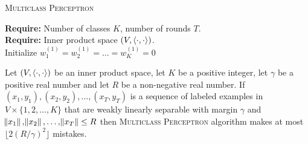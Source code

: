 \begin{algorithm}[h]
\caption{\textsc{Multiclass Perceptron}
\label{algorithm:mutliclass-perceptron}}
\textbf{Require:} Number of classes $K$, number of rounds $T$. \\
\textbf{Require:} Inner product space $(V,\left\langle \cdot, \cdot \right\rangle)$. \\
Initialize $w_1^{(1)} = w_2^{(1)} = \dots = w_K^{(1)} = 0$ \\
\end{algorithm}

\begin{theorem}
\label{theorem:mutliclass-perceptron-mistake-upper-bound}
Let $(V, \left\langle \cdot, \cdot \right\rangle)$ be an inner product space, let $K$ be a positive
integer, let $\gamma$ be a positive real number and let $R$ be a non-negative real
number. If $(x_1, y_1), (x_2, y_2), \dots, (x_T, y_T)$ is a sequence of labeled
examples in $V \times \{1,2,\dots,K\}$ that are weakly linearly separable with margin
$\gamma$ and $\norm{x_1}, \norm{x_2}, \dots, \norm{x_T} \le R$
then \textsc{Multiclass Perceptron} algorithm makes at most $\lfloor
2(R/\gamma)^2 \rfloor$ mistakes.
\end{theorem}


